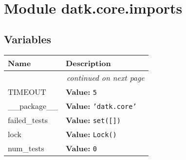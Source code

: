 %
%
%


\section{Module datk.core.imports}

    \label{datk:core:imports}


  \subsection{Variables}

    \vspace{-1cm}
\hspace{\varindent}\begin{longtable}{|p{\varnamewidth}|p{\vardescrwidth}|l}
\cline{1-2}
\cline{1-2} \centering \textbf{Name} & \centering \textbf{Description}& \\
\cline{1-2}
\endhead\cline{1-2}\multicolumn{3}{r}{\small\textit{continued on next page}}\\\endfoot\cline{1-2}
\endlastfoot\raggedright T\-I\-M\-E\-O\-U\-T\- & \raggedright \textbf{Value:} 
{\tt 5}&\\
\cline{1-2}
\raggedright \_\-\_\-p\-a\-c\-k\-a\-g\-e\-\_\-\_\- & \raggedright \textbf{Value:} 
{\tt \texttt{'}\texttt{datk.core}\texttt{'}}&\\
\cline{1-2}
\raggedright f\-a\-i\-l\-e\-d\-\_\-t\-e\-s\-t\-s\- & \raggedright \textbf{Value:} 
{\tt \texttt{set([}\texttt{])}}&\\
\cline{1-2}
\raggedright l\-o\-c\-k\- & \raggedright \textbf{Value:} 
{\tt Lock()}&\\
\cline{1-2}
\raggedright n\-u\-m\-\_\-t\-e\-s\-t\-s\- & \raggedright \textbf{Value:} 
{\tt 0}&\\
\cline{1-2}
\end{longtable}

